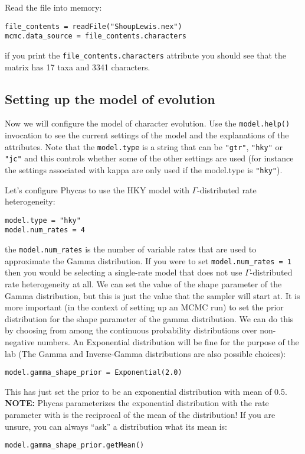 \documentclass{article}
\newcommand{\cmd}[1]{\texttt{#1}\xspace}
\newcommand{\phycas}{Phycas\xspace}
\begin{document}
Read the file into memory:
\begin{verbatim}
file_contents = readFile("ShoupLewis.nex")
mcmc.data_source = file_contents.characters
\end{verbatim}
if you print the \cmd{file\_contents.characters} attribute you should see that the matrix has 17 taxa and 3341 characters.

\subsection{Setting up the model of evolution}
Now we will configure the model of character evolution. 
Use the \cmd{model.help()} invocation to see the current settings of the model and the explanations of the
attributes.
Note that the \cmd{model.type} is a string that can be \texttt{"gtr"}, \texttt{"hky"} or \texttt{"jc"} and this controls whether some of the other settings are used (for instance the settings associated with kappa are only used if the model.type is \texttt{"hky"}).

Let's configure \phycas to use the HKY model with $\Gamma$-distributed rate heterogeneity:

\begin{verbatim}
model.type = "hky"
model.num_rates = 4
\end{verbatim}
the \cmd{model.num\_rates} is the number of variable rates that are used to approximate the Gamma distribution. 
If you were to set \cmd{model.num\_rates = 1} then you would be selecting a single-rate model that does not use $\Gamma$-distributed rate heterogeneity at all.
We can set the value of the shape parameter of the Gamma distribution, but this is just the value that the sampler will start at.  
It is more important (in the context of setting up an MCMC run) to set the prior distribution for the  shape parameter of the gamma distribution.
We can do this by choosing from among the continuous probability distributions over non-negative numbers.
An Exponential distribution will be fine for the purpose of the lab (The Gamma and Inverse-Gamma distributions are also possible choices):
\begin{verbatim}
model.gamma_shape_prior = Exponential(2.0)
\end{verbatim}
This has just set the prior to be an exponential distribution with mean of 0.5.
\\{\bf NOTE:}  \phycas parameterizes the exponential distribution with the rate parameter with is the reciprocal of the mean of the distribution!
If you are unsure, you can always ``ask'' a distribution what its mean is:
\begin{verbatim}
model.gamma_shape_prior.getMean()
\end{verbatim}
\end{document}
